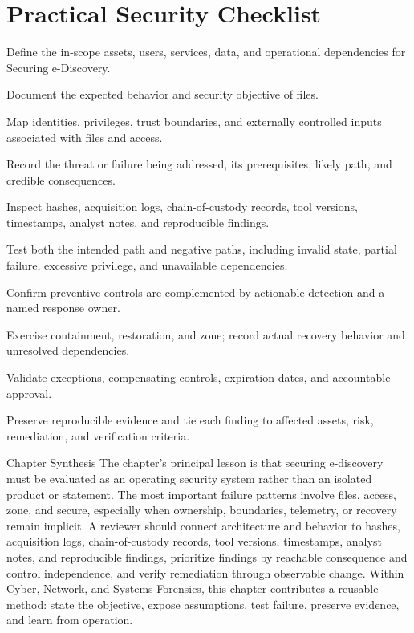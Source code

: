 \documentclass[11pt,letterpaper]{article}
\begin{document}
\section*{Practical Security Checklist}
\begin{CornellChecklist}
\item Define the in-scope assets, users, services, data, and operational dependencies for Securing e-Discovery.
\item Document the expected behavior and security objective of files.
\item Map identities, privileges, trust boundaries, and externally controlled inputs associated with files and access.
\item Record the threat or failure being addressed, its prerequisites, likely path, and credible consequences.
\item Inspect hashes, acquisition logs, chain-of-custody records, tool versions, timestamps, analyst notes, and reproducible findings.
\item Test both the intended path and negative paths, including invalid state, partial failure, excessive privilege, and unavailable dependencies.
\item Confirm preventive controls are complemented by actionable detection and a named response owner.
\item Exercise containment, restoration, and zone; record actual recovery behavior and unresolved dependencies.
\item Validate exceptions, compensating controls, expiration dates, and accountable approval.
\item Preserve reproducible evidence and tie each finding to affected assets, risk, remediation, and verification criteria.
\end{CornellChecklist}
\begin{CornellSummaryBox}{Chapter Synthesis}
The chapter's principal lesson is that securing e-discovery must be evaluated as an operating security system rather than an isolated product or statement. The most important failure patterns involve files, access, zone, and secure, especially when ownership, boundaries, telemetry, or recovery remain implicit. A reviewer should connect architecture and behavior to hashes, acquisition logs, chain-of-custody records, tool versions, timestamps, analyst notes, and reproducible findings, prioritize findings by reachable consequence and control independence, and verify remediation through observable change. Within Cyber, Network, and Systems Forensics, this chapter contributes a reusable method: state the objective, expose assumptions, test failure, preserve evidence, and learn from operation.
\end{CornellSummaryBox}
\end{document}
